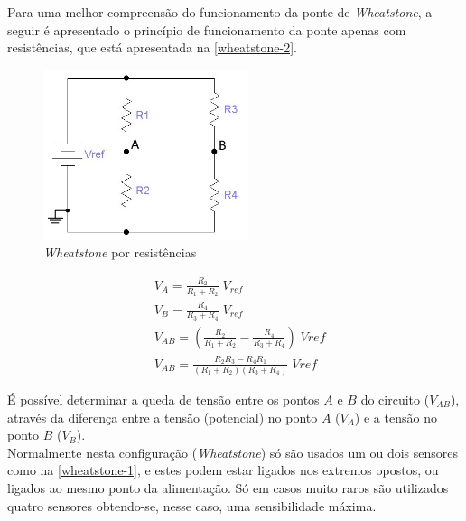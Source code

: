\vspace{.5cm}
Para uma melhor compreensão do funcionamento da ponte de \textit{Wheatstone}, a seguir é apresentado o princípio de funcionamento da ponte apenas com resistências, que está apresentada na \autoref{wheatstone-2}.
\\
\begin{minipage}[!b]{.45\linewidth}
	\begin{figure}[H]
		\captionsetup{justification=raggedright,singlelinecheck=false}
		\flushleft
		\includegraphics[height=5cm]{./image/PESTA/schematic/Wheatstone-1.jpg}
		\caption{\textit{Wheatstone} por resistências \cite{book-10}}
		\label{wheatstone-2}
	\end{figure}
\end{minipage}
\begin{minipage}[!b]{.5\linewidth}
	\setlength{\jot}{10pt}%
	\small
	\begin{align}
		\label{eq:wheatstone}
		&V_A =  \frac{R_2}{R_1 + R_2} \; V_{ref} \\ &V_B=\frac{R_4}{R_3 + R_4} \; V_{ref} \\
		&V_{AB}= \left(\frac{R_2}{R_1 + R_2} - \frac{R_4}{R_3 + R_4}\right) \; Vref \\
		&V_{AB} = \frac{R_2 R_3 - R_4 R_1}{(R_1 + R_2)(R_3 + R_4)} \; Vref
	\end{align}
\vspace{1pt}
\end{minipage}
É possível determinar a queda de tensão entre os pontos $A$ e $B$ do circuito ($V_{AB}$), através da diferença entre a tensão (potencial) no ponto $A$ ($V_A$) e a tensão no ponto $B$ ($V_B$).\\
Normalmente nesta configuração (\textit{Wheatstone}) só são usados um ou dois sensores como na \autoref{wheatstone-1}, e estes podem estar ligados nos extremos opostos, ou ligados ao mesmo ponto da alimentação. Só em casos muito raros são utilizados quatro sensores obtendo-se, nesse caso, uma sensibilidade máxima.

